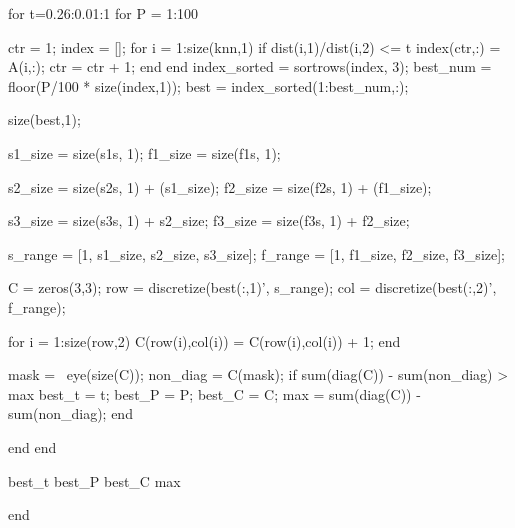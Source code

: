 for t=0.26:0.01:1
    for P = 1:100




ctr = 1;
index = [];
for i = 1:size(knn,1)
    if dist(i,1)/dist(i,2) <= t
        index(ctr,:) = A(i,:);
        ctr = ctr + 1;
    end
end
index_sorted = sortrows(index, 3);
best_num = floor(P/100 * size(index,1));
best = index_sorted(1:best_num,:);

size(best,1);

s1_size = size(s1s, 1);
f1_size = size(f1s, 1);

s2_size = size(s2s, 1) + (s1_size);
f2_size = size(f2s, 1) + (f1_size);

s3_size = size(s3s, 1) + s2_size;
f3_size = size(f3s, 1) + f2_size;

s_range = [1, s1_size, s2_size, s3_size];
f_range = [1, f1_size, f2_size, f3_size];

C = zeros(3,3);
row = discretize(best(:,1)', s_range);
col = discretize(best(:,2)', f_range);


for i = 1:size(row,2)
    C(row(i),col(i)) = C(row(i),col(i)) + 1;
end

mask = ~eye(size(C));
non_diag = C(mask);
if sum(diag(C)) - sum(non_diag) > max
    best_t = t;
    best_P = P;
    best_C = C;
    max = sum(diag(C)) - sum(non_diag);
end


    end
end

best_t
best_P
best_C
max

end    